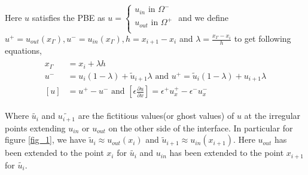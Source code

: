 Here $u$ satisfies the PBE as $u=\begin{cases}
u_{in} \text{ in }\Omega^-\\
u_{out}\text{ in }\Omega^+\\
\end{cases}$ and we define $u^+ = u_{out}(x_\Gamma),u^- = u_{in}(x_\Gamma),h=x_{i+1}-x_i$ and  $\lambda =\frac{x_\Gamma-x_i}{h}$ to get following equations,
\begin{eqnarray}
\begin{aligned}
x_\Gamma &= x_i + \lambda h  \\
u^- &= u_i(1-\lambda )+ \tilde{u}_{i+1} \lambda \text{ and }u^+ = \tilde{u}_i(1-\lambda )+ u_{i+1} \lambda\\
\left[u\right]  & = u^+-u^- \text{ and }\left[ \epsilon \frac{\partial u}{\partial x} \right] =  \epsilon^+ u^+_x-\epsilon^- u^-_x
\end{aligned}\label{1d_GFM}
\end{eqnarray}
	
Where $\tilde{u_i}$ and $\tilde{u_{i+1}}$ are the fictitious values(or ghost values) of $u$ at the irregular points extending $u_{in}$ or $u_{out}$ on the other side of the interface. In particular for figure \ref{fig_1},  we have $\tilde{u}_i \approx u_{out}(x_i)$ and $\tilde{u}_{i+1}\approx u_{in}(x_{i+1})$. Here $u_{out}$ has been extended to the point $x_i$ for $\tilde{u_i}$ and $u_{in}$ has been extended to the point $x_{i+1}$ for $\tilde{u_i}$. 

